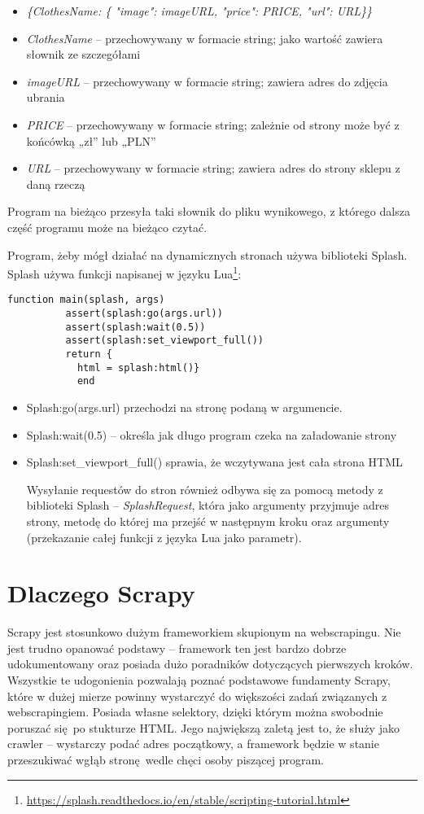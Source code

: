 \begin{itemize}
\item[] \emph{\{ClothesName: \{ "image": imageURL, "price": PRICE, "url": URL\}\}}
\item[] \emph{ClothesName} – przechowywany w formacie string; jako wartość zawiera słownik ze szczegółami
\item[] \emph{imageURL} – przechowywany w formacie string; zawiera adres do zdjęcia ubrania
\item[] \emph{PRICE} – przechowywany w formacie string; zależnie od strony może być z końcówką „zł” lub „PLN”
\item[] \emph{URL} – przechowywany w formacie string; zawiera adres do strony sklepu z daną rzeczą
\end{itemize}
Program na bieżąco przesyła taki słownik do pliku wynikowego, z którego dalsza część programu może na bieżąco czytać.


Program, żeby mógł działać na dynamicznych stronach używa biblioteki Splash.
Splash używa funkcji napisanej w języku Lua\footnote{\url{https://splash.readthedocs.io/en/stable/scripting-tutorial.html}}:
\begin{lstlisting}
function main(splash, args)
          assert(splash:go(args.url))
          assert(splash:wait(0.5))
          assert(splash:set_viewport_full())
          return {
            html = splash:html()}
            end
\end{lstlisting}

\begin{itemize}
\item[] Splash:go(args.url) przechodzi na stronę podaną w argumencie.
\item[] Splash:wait(0.5) – określa jak długo program czeka na załadowanie strony
\item[] Splash:set\_viewport\_full() sprawia, że wczytywana jest cała strona HTML

Wysyłanie requestów do stron również odbywa się za pomocą metody z biblioteki Splash -- \emph{SplashRequest}, która jako argumenty przyjmuje adres strony, metodę do której ma przejść w następnym kroku oraz argumenty (przekazanie całej funkcji z języka Lua jako parametr).
\end{itemize}
\section{Dlaczego Scrapy}

Scrapy jest stosunkowo dużym frameworkiem skupionym na webscrapingu. Nie jest trudno opanować podstawy -- framework ten jest bardzo dobrze udokumentowany oraz posiada dużo poradników dotyczących pierwszych kroków. Wszystkie te udogonienia pozwalają poznać podstawowe fundamenty Scrapy, które w dużej mierze powinny wystarczyć do większości zadań związanych z webscrapingiem. Posiada własne selektory, dzięki którym można swobodnie poruszać się po stukturze HTML. Jego największą zaletą jest to, że służy jako crawler -- wystarczy podać adres początkowy, a framework będzie w stanie przeszukiwać wgłąb stronę wedle chęci osoby piszącej program\cite{Istherea56:online}\cite{Whataret55:online}.

